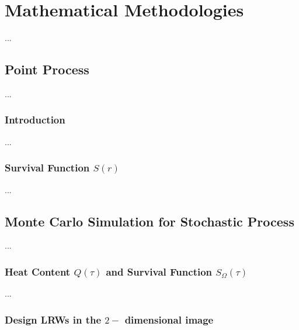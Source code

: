 \section{Mathematical Methodologies}

...

  \subsection{Point Process}

  ...

     \subsubsection{Introduction}

      ...

     \subsubsection{Survival Function $S(r)$}
     

      ...
      

  \subsection{Monte Carlo Simulation for Stochastic Process}


  ...

    \subsubsection{Heat Content $Q(\tau)$ and Survival Function $S_{\Omega}(\tau)$}

  
    ...



    \subsubsection{Design LRWs in the $2-$ dimensional image}
    
